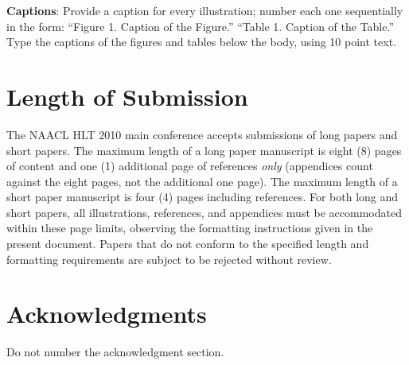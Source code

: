 \documentclass[11pt,letterpaper]{article}
\begin{document}
{\bf Captions}: Provide a caption for every illustration; number each one
sequentially in the form:  ``Figure 1. Caption of the Figure.'' ``Table 1.
Caption of the Table.''  Type the captions of the figures and
tables below the body, using 10 point text.

\section{Length of Submission}
\label{sec:length}

The NAACL HLT 2010 main conference accepts submissions of long papers
and short papers.  The maximum length of a long paper manuscript is
eight (8) pages of content and one (1) additional page of references
\emph{only} (appendices count against the eight pages, not the
additional one page).  The maximum length of a short paper manuscript
is four (4) pages including references.  For both long and short
papers, all illustrations, references, and appendices must be
accommodated within these page limits, observing the formatting
instructions given in the present document.  Papers that do not
conform to the specified length and formatting requirements are
subject to be rejected without review.


\section*{Acknowledgments}

Do not number the acknowledgment section.
\end{document}
